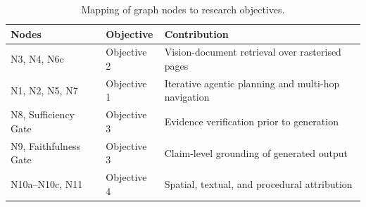 \begin{table}[htbp]
\centering
\small
\begin{tabular}{llp{5.4cm}}
\toprule
\textbf{Nodes} & \textbf{Objective} & \textbf{Contribution} \\
\midrule
N3, N4, N6c & Objective 2 & Vision-document retrieval over rasterised pages \\
N1, N2, N5, N7 & Objective 1 & Iterative agentic planning and multi-hop navigation \\
N8, Sufficiency Gate & Objective 3 & Evidence verification prior to generation \\
N9, Faithfulness Gate & Objective 3 & Claim-level grounding of generated output \\
N10a--N10c, N11 & Objective 4 & Spatial, textual, and procedural attribution \\
\bottomrule
\end{tabular}
\caption{Mapping of graph nodes to research objectives.}
\label{tab:node-mapping}
\end{table}